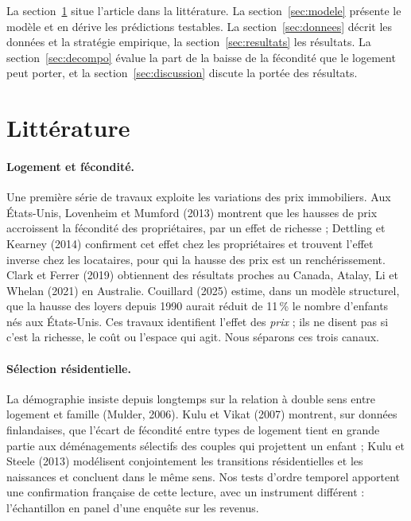 \documentclass[11pt,a4paper]{article}
\theoremstyle{plain}
\theoremstyle{definition}
\theoremstyle{remark}
\begin{document}
La section~\ref{sec:litt} situe l'article dans la littérature. La section~\ref{sec:modele} présente le modèle et en dérive les prédictions testables. La section~\ref{sec:donnees} décrit les données et la stratégie empirique, la section~\ref{sec:resultats} les résultats. La section~\ref{sec:decompo} évalue la part de la baisse de la fécondité que le logement peut porter, et la section~\ref{sec:discussion} discute la portée des résultats.

\section{Littérature}\label{sec:litt}

\paragraph{Logement et fécondité.} Une première série de travaux exploite les variations des prix immobiliers. Aux États-Unis, Lovenheim et Mumford (2013) montrent que les hausses de prix accroissent la fécondité des propriétaires, par un effet de richesse ; Dettling et Kearney (2014) confirment cet effet chez les propriétaires et trouvent l'effet inverse chez les locataires, pour qui la hausse des prix est un renchérissement. Clark et Ferrer (2019) obtiennent des résultats proches au Canada, Atalay, Li et Whelan (2021) en Australie. Couillard (2025) estime, dans un modèle structurel, que la hausse des loyers depuis 1990 aurait réduit de 11\,\% le nombre d'enfants nés aux États-Unis. Ces travaux identifient l'effet des \emph{prix} ; ils ne disent pas si c'est la richesse, le coût ou l'espace qui agit. Nous séparons ces trois canaux.

\paragraph{Sélection résidentielle.} La démographie insiste depuis longtemps sur la relation à double sens entre logement et famille (Mulder, 2006). Kulu et Vikat (2007) montrent, sur données finlandaises, que l'écart de fécondité entre types de logement tient en grande partie aux déménagements sélectifs des couples qui projettent un enfant ; Kulu et Steele (2013) modélisent conjointement les transitions résidentielles et les naissances et concluent dans le même sens. Nos tests d'ordre temporel apportent une confirmation française de cette lecture, avec un instrument différent : l'échantillon en panel d'une enquête sur les revenus.
\end{document}
